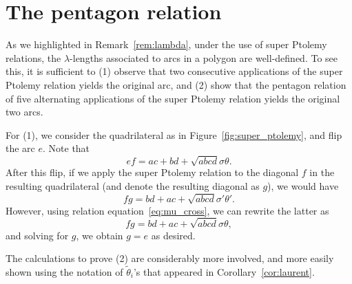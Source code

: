 \documentclass[11pt]{article}
\numberwithin{equation}{section}
\numberwithin{equation}{section}
\begin{document}
\setcounter{figure}{17}\setcounter{footnote}{5}
\appendix
\section{The pentagon relation} \label{appendix}

As we highlighted in Remark~\ref{rem:lambda}, under the use of super Ptolemy relations, the $\lambda$-lengths associated to arcs in a polygon are well-defined. To see this, it is sufficient to (1) observe that two consecutive applications of the super Ptolemy relation yields the original arc, and (2) show that the pentagon relation of five alternating applications of the super Ptolemy relation yields the original two arcs.

For (1), we consider the quadrilateral as in Figure~\ref{fig:super_ptolemy}, and flip the arc $e$.
Note that \[ef = ac + bd + \sqrt{abcd} \sigma \theta.\]
After this flip, if we apply the super Ptolemy relation to the diagonal $f$ in the resulting quadrilateral (and denote the resulting diagonal as $g$), we would have
\[fg = bd + ac + \sqrt{abcd} \sigma' \theta'.\]
However, using relation equation~\eqref{eq:mu_cross}, we can rewrite the latter as
\[fg = bd + ac + \sqrt{abcd} \sigma \theta,\] and solving for $g$, we obtain $g = e$ as desired.

The calculations to prove (2) are considerably more involved, and more easily shown using the notation of $\widetilde{\theta}_i$'s
that appeared in Corollary~\ref{cor:laurent}.
\end{document}
